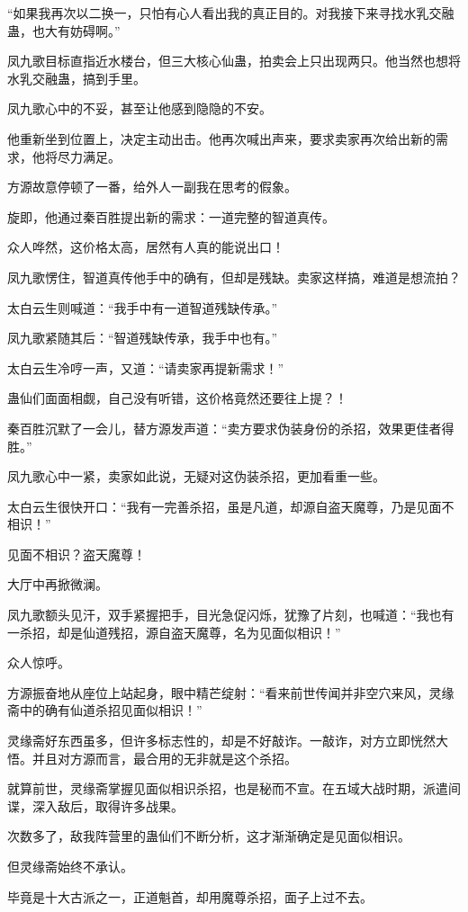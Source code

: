 \begin{this_body}
“如果我再次以二换一，只怕有心人看出我的真正目的。对我接下来寻找水乳交融蛊，也大有妨碍啊。”

凤九歌目标直指近水楼台，但三大核心仙蛊，拍卖会上只出现两只。他当然也想将水乳交融蛊，搞到手里。

凤九歌心中的不妥，甚至让他感到隐隐的不安。

他重新坐到位置上，决定主动出击。他再次喊出声来，要求卖家再次给出新的需求，他将尽力满足。

方源故意停顿了一番，给外人一副我在思考的假象。

旋即，他通过秦百胜提出新的需求：一道完整的智道真传。

众人哗然，这价格太高，居然有人真的能说出口！

凤九歌愣住，智道真传他手中的确有，但却是残缺。卖家这样搞，难道是想流拍？

太白云生则喊道：“我手中有一道智道残缺传承。”

凤九歌紧随其后：“智道残缺传承，我手中也有。”

太白云生冷哼一声，又道：“请卖家再提新需求！”

蛊仙们面面相觑，自己没有听错，这价格竟然还要往上提？！

秦百胜沉默了一会儿，替方源发声道：“卖方要求伪装身份的杀招，效果更佳者得胜。”

凤九歌心中一紧，卖家如此说，无疑对这伪装杀招，更加看重一些。

太白云生很快开口：“我有一完善杀招，虽是凡道，却源自盗天魔尊，乃是见面不相识！”

见面不相识？盗天魔尊！

大厅中再掀微澜。

凤九歌额头见汗，双手紧握把手，目光急促闪烁，犹豫了片刻，也喊道：“我也有一杀招，却是仙道残招，源自盗天魔尊，名为见面似相识！”

众人惊呼。

方源振奋地从座位上站起身，眼中精芒绽射：“看来前世传闻并非空穴来风，灵缘斋中的确有仙道杀招见面似相识！”

灵缘斋好东西虽多，但许多标志性的，却是不好敲诈。一敲诈，对方立即恍然大悟。并且对方源而言，最合用的无非就是这个杀招。

就算前世，灵缘斋掌握见面似相识杀招，也是秘而不宣。在五域大战时期，派遣间谍，深入敌后，取得许多战果。

次数多了，敌我阵营里的蛊仙们不断分析，这才渐渐确定是见面似相识。

但灵缘斋始终不承认。

毕竟是十大古派之一，正道魁首，却用魔尊杀招，面子上过不去。


\end{this_body}
